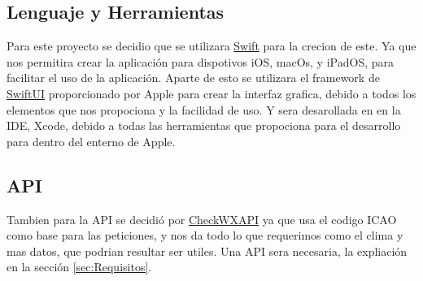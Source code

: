 \subsection{Lenguaje y Herramientas}
\label{subsec:LengHerr}

Para este proyecto se decidio que se utilizara \href{https://www.swift.org}{Swift} para la crecion de este. Ya que nos
permitira crear la aplicación para dispotivos iOS, macOs, y iPadOS, para facilitar el uso de la aplicación. Aparte de esto se
utilizara el framework de \href{https://developer.apple.com/documentation/swiftui/}{SwiftUI} proporcionado por Apple para crear la
interfaz grafica, debido a todos los elementos que nos propociona y la facilidad de uso. Y sera desarollada en en la IDE, Xcode, debido a todas las herramientas que propociona para el desarrollo para
dentro del enterno de Apple.


\subsection{API}
\label{subsec:API}
Tambien para la API se decidió por \href{https://www.checkwxapi.com}{CheckWXAPI} ya que usa el codigo ICAO como base para las peticiones,
y nos da todo lo que requerimos como el clima y mas datos, que podrian resultar ser utiles. Una API sera necesaria, la expliación en la
sección \ref{sec:Requisitos}.
